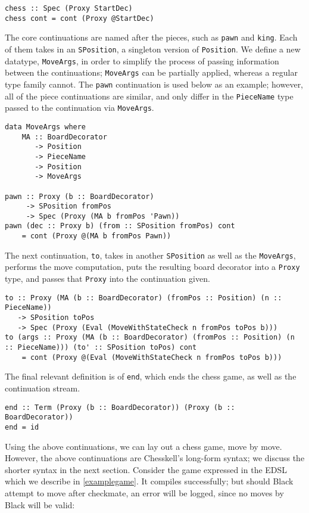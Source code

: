 \documentclass[12pt, a4paper, bibliography=totocnumbered]{scrreprt}
\newcommand{\inline}[1]{\lstinline[basicstyle=\ttfamily\footnotesize]{#1}}
\begin{document}
\begin{lstlisting}
chess :: Spec (Proxy StartDec)
chess cont = cont (Proxy @StartDec)
\end{lstlisting}

The core continuations are named after the pieces, such as \inline{pawn} and \inline{king}. Each of them takes in an \inline{SPosition}, a singleton version of \inline{Position}. We define a new datatype, \inline{MoveArgs}, in order to simplify the process of passing information between the continuations; \inline{MoveArgs} can be partially applied, whereas a regular type family cannot. The \inline{pawn} continuation is used below as an example; however, all of the piece continuations are similar, and only differ in the \inline{PieceName} type passed to the continuation via \inline{MoveArgs}.

\begin{lstlisting}
data MoveArgs where
    MA :: BoardDecorator
       -> Position
       -> PieceName
       -> Position
       -> MoveArgs

pawn :: Proxy (b :: BoardDecorator)
     -> SPosition fromPos
     -> Spec (Proxy (MA b fromPos 'Pawn))
pawn (dec :: Proxy b) (from :: SPosition fromPos) cont
    = cont (Proxy @(MA b fromPos Pawn))
\end{lstlisting}

The next continuation, \inline{to}, takes in another \inline{SPosition} as well as the \lstinline{MoveArgs}, performs the move computation, puts the resulting board decorator into a \inline{Proxy} type, and passes that \inline{Proxy} into the continuation given.

\begin{lstlisting}
to :: Proxy (MA (b :: BoardDecorator) (fromPos :: Position) (n :: PieceName))
   -> SPosition toPos
   -> Spec (Proxy (Eval (MoveWithStateCheck n fromPos toPos b)))
to (args :: Proxy (MA (b :: BoardDecorator) (fromPos :: Position) (n :: PieceName))) (to' :: SPosition toPos) cont
    = cont (Proxy @(Eval (MoveWithStateCheck n fromPos toPos b)))
\end{lstlisting}

The final relevant definition is of \inline{end}, which ends the chess game, as well as the continuation stream.

\begin{lstlisting}
end :: Term (Proxy (b :: BoardDecorator)) (Proxy (b :: BoardDecorator))
end = id
\end{lstlisting}

Using the above continuations, we can lay out a chess game, move by move. However, the above continuations are Chesskell's long-form syntax; we discuss the shorter syntax in the next section. Consider the game expressed in the EDSL which we describe in \cref{examplegame}. It compiles successfully; but should Black attempt to move after checkmate, an error will be logged, since no moves by Black will be valid:
\end{document}
